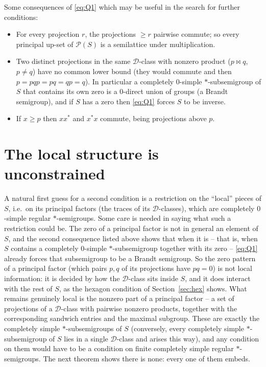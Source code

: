 \documentclass[11pt]{amsart}
\theoremstyle{definition}
\newcommand{\D}{\mathcal{D}}
\renewcommand{\P}{\mathcal{P}}
\newcommand{\mt}{\bowtie}   %
\begin{document}
Some consequences of \eqref{eq:Q1} which may be useful in the search for further conditions:
\begin{itemize}[nosep]
\item For every projection $r$, the projections $\ge r$ pairwise commute; so every principal up-set of $\P(S)$ is a semilattice under multiplication.
\item Two distinct projections in the same $\D$-class with nonzero product ($p\mt q$, $p\ne q$) have no common lower bound (they would commute and then $p=pqp=pq=qp=q$). In particular a completely $0$-simple $*$-subsemigroup of $S$ that contains its own zero is a $0$-direct union of groups (a Brandt semigroup), and if $S$ has a zero then \eqref{eq:Q1} forces $S$ to be inverse.
\item If $x\ge p$ then $xx^*$ and $x^*x$ commute, being projections above $p$.
\end{itemize}

\section{The local structure is unconstrained}\label{sec:local}

A natural first guess for a second condition is a restriction on the ``local'' pieces of $S$, i.e.\ on its principal factors (the traces of its $\D$-classes), which are completely $0$-simple regular $*$-semigroups. Some care is needed in saying what such a restriction could be. The zero of a principal factor is not in general an element of $S$, and the second consequence listed above shows that when it is -- that is, when $S$ contains a completely $0$-simple $*$-subsemigroup together with its zero -- \eqref{eq:Q1} already forces that subsemigroup to be a Brandt semigroup. So the zero pattern of a principal factor (which pairs $p,q$ of its projections have $pq=0$) is not local information: it is decided by how the $\D$-class sits inside $S$, and it does interact with the rest of $S$, as the hexagon condition of Section~\ref{sec:hex} shows. What remains genuinely local is the nonzero part of a principal factor -- a set of projections of a $\D$-class with pairwise nonzero products, together with the corresponding sandwich entries and the maximal subgroup. These are exactly the completely simple $*$-subsemigroups of $S$ (conversely, every completely simple $*$-subsemigroup of $S$ lies in a single $\D$-class and arises this way), and any condition on them would have to be a condition on finite completely simple regular $*$-semigroups. The next theorem shows there is none: every one of them embeds.
\end{document}
